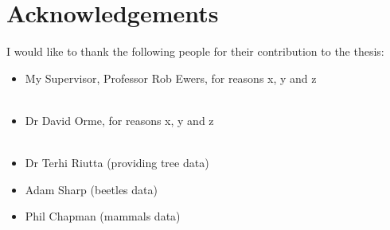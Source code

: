 \clearpage


\section*{Acknowledgements}

I would like to thank the following people for their contribution to the thesis:

\begin{itemize}
 \item My Supervisor, Professor Rob Ewers, for reasons x, y and z \\ \\
 \vspace*{3mm}
 \item Dr David Orme, for reasons x, y and z \\ \\
 \vspace*{3mm}
 \item Dr Terhi Riutta (providing tree data) \\
 \vspace*{3mm}
 \item Adam Sharp (beetles data) \\
 \vspace*{3mm}
 \item Phil Chapman (mammals data) \\
\end{itemize}